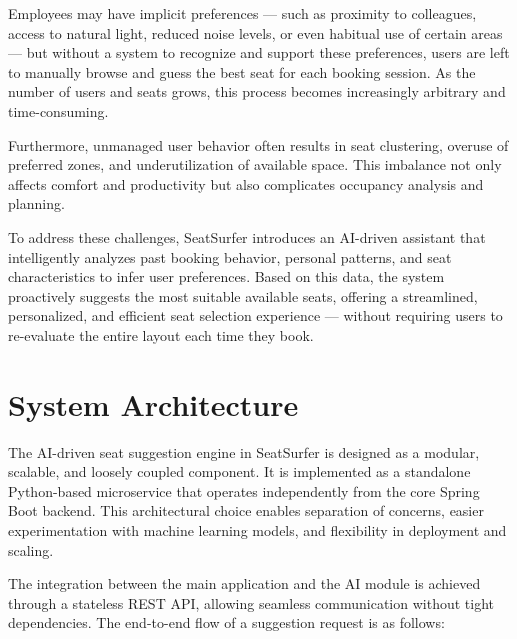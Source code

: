 \documentclass[12pt,a4paper]{report}
\begin{document}
Employees may have implicit preferences — such as proximity to colleagues, access to natural light, reduced noise levels, or even habitual use of certain areas — but without a system to recognize and support these preferences, users are left to manually browse and guess the best seat for each booking session. As the number of users and seats grows, this process becomes increasingly arbitrary and time-consuming.

Furthermore, unmanaged user behavior often results in seat clustering, overuse of preferred zones, and underutilization of available space. This imbalance not only affects comfort and productivity but also complicates occupancy analysis and planning.

To address these challenges, SeatSurfer introduces an AI-driven assistant that intelligently analyzes past booking behavior, personal patterns, and seat characteristics to infer user preferences. Based on this data, the system proactively suggests the most suitable available seats, offering a streamlined, personalized, and efficient seat selection experience — without requiring users to re-evaluate the entire layout each time they book.

\section{System Architecture}

The AI-driven seat suggestion engine in SeatSurfer is designed as a modular, scalable, and loosely coupled component. It is implemented as a standalone Python-based microservice that operates independently from the core Spring Boot backend. This architectural choice enables separation of concerns, easier experimentation with machine learning models, and flexibility in deployment and scaling.

The integration between the main application and the AI module is achieved through a stateless REST API, allowing seamless communication without tight dependencies. The end-to-end flow of a suggestion request is as follows:
\end{document}
